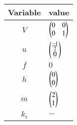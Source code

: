 \begin{tabular}{|c|p{1cm}|}
    \hline
	Variable  &  value \\
    \hline
        $V$ &  $\begin{pmatrix}0&0\\0&1\end{pmatrix}$ \\
    \hline
        $u$ & $\begin{pmatrix}\frac{-1}{2}\\0\end{pmatrix}$ \\
    \hline
	$f$ &   $0$  \\
    \hline 
	$h$ &  $\begin{pmatrix}0\\0\end{pmatrix}$ \\
    \hline
        $m$ &  $\begin{pmatrix}2 \\ 1\end{pmatrix}$ \\
    \hline		
    	$k_i$ & $-$ \\
    \hline	
\end{tabular}